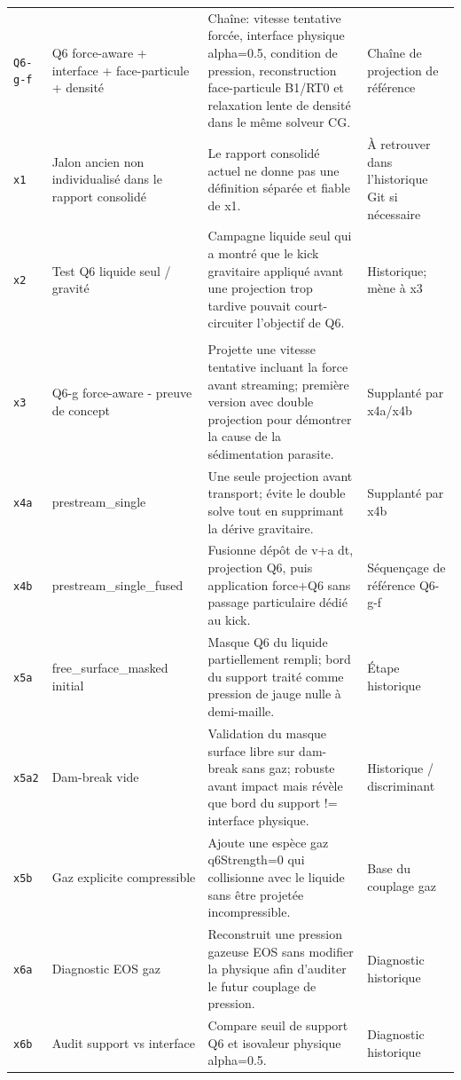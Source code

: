 \documentclass[a4paper,9pt]{article}
\begin{document}
\begin{landscape}
\begin{longtable}{L{2.35cm} L{5.3cm} L{13.25cm} L{4.75cm}}
\texttt{Q6-g-f} & Q6 force-aware + interface + face-particule + densité & Chaîne: vitesse tentative forcée, interface physique alpha=0.5, condition de pression, reconstruction face-particule B1/RT0 et relaxation lente de densité dans le même solveur CG. & Chaîne de projection de référence \\
\texttt{x1} & Jalon ancien non individualisé dans le rapport consolidé & Le rapport consolidé actuel ne donne pas une définition séparée et fiable de x1. & À retrouver dans l'historique Git si nécessaire \\
\texttt{x2} & Test Q6 liquide seul / gravité & Campagne liquide seul qui a montré que le kick gravitaire appliqué avant une projection trop tardive pouvait court-circuiter l'objectif de Q6. & Historique; mène à x3 \\
\\
\texttt{x3} & Q6-g force-aware - preuve de concept & Projette une vitesse tentative incluant la force avant streaming; première version avec double projection pour démontrer la cause de la sédimentation parasite. & Supplanté par x4a/x4b \\
\texttt{x4a} & prestream\_single & Une seule projection avant transport; évite le double solve tout en supprimant la dérive gravitaire. & Supplanté par x4b \\
\texttt{x4b} & prestream\_single\_fused & Fusionne dépôt de v+a dt, projection Q6, puis application force+Q6 sans passage particulaire dédié au kick. & Séquençage de référence Q6-g-f \\
\texttt{x5a} & free\_surface\_masked initial & Masque Q6 du liquide partiellement rempli; bord du support traité comme pression de jauge nulle à demi-maille. & Étape historique \\
\texttt{x5a2} & Dam-break vide & Validation du masque surface libre sur dam-break sans gaz; robuste avant impact mais révèle que bord du support != interface physique. & Historique / discriminant \\
\texttt{x5b} & Gaz explicite compressible & Ajoute une espèce gaz q6Strength=0 qui collisionne avec le liquide sans être projetée incompressible. & Base du couplage gaz \\
\texttt{x6a} & Diagnostic EOS gaz & Reconstruit une pression gazeuse EOS sans modifier la physique afin d'auditer le futur couplage de pression. & Diagnostic historique \\
\texttt{x6b} & Audit support vs interface & Compare seuil de support Q6 et isovaleur physique alpha=0.5. & Diagnostic historique \\

\end{longtable}
\end{landscape}
\end{document}
